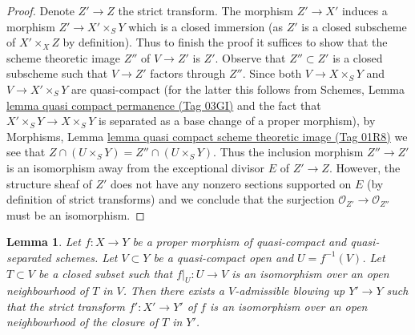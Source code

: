 \documentclass{amsart}
\theoremstyle{plain}
\newtheorem{lemma}[subsection]{Lemma}
\theoremstyle{definition}
\theoremstyle{remark}
\numberwithin{equation}{subsection}
\begin{document}
\begin{proof}
Denote $Z' \to Z$ the strict transform. The morphism $Z' \to X'$
induces a morphism $Z' \to X' \times_S Y$ which is a closed immersion
(as $Z'$ is a closed subscheme of $X' \times_X Z$ by definition).
Thus to finish the proof it suffices to show that the scheme theoretic
image $Z''$ of $V \to Z'$ is $Z'$. Observe that $Z'' \subset Z'$
is a closed subscheme such that $V \to Z'$ factors through $Z''$.
Since both $V \to X \times_S Y$ and $V \to X' \times_S Y$ are
quasi-compact (for the latter this follows from Schemes, Lemma
\href{https://stacks.math.columbia.edu/tag/03GI}{lemma quasi compact permanence (Tag 03GI)}
and the fact that $X' \times_S Y \to X \times_S Y$ is separated
as a base change of a proper morphism), by Morphisms, Lemma
\href{https://stacks.math.columbia.edu/tag/01R8}{lemma quasi compact scheme theoretic image (Tag 01R8)}
we see that $Z \cap (U \times_S Y) = Z'' \cap (U \times_S Y)$.
Thus the inclusion morphism $Z'' \to Z'$ is an isomorphism
away from the exceptional divisor $E$ of $Z' \to Z$. However, the
structure sheaf of $Z'$ does not have any nonzero sections supported
on $E$ (by definition of strict transforms) and we conclude that
the surjection $\mathcal{O}_{Z'} \to \mathcal{O}_{Z''}$
must be an isomorphism.
\end{proof}


\begin{lemma}
\label{lemma-blowup-iso-along}
Let $f : X \to Y$ be a proper morphism of quasi-compact and
quasi-separated schemes. Let $V \subset Y$ be a quasi-compact open
and $U = f^{-1}(V)$. Let $T \subset V$ be a closed subset such that
$f|_U : U \to V$ is an isomorphism over an open neighbourhood of $T$
in $V$. Then there exists a $V$-admissible blowing up $Y' \to Y$
such that the strict transform $f' : X' \to Y'$ of $f$
is an isomorphism over an open neighbourhood of the closure
of $T$ in $Y'$.
\end{lemma}
\end{document}
